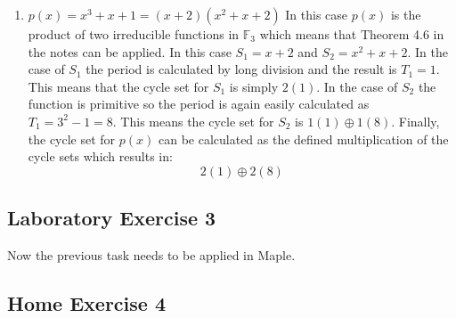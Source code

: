 \documentclass{article}
\begin{document}
\begin{enumerate}
    \item $p(x)=x^3+x+1=(x+2)(x^2+x+2)$ \newline
    In this case $p(x)$ is the product of two irreducible functions in $\mathbb F_{3}$ which means that Theorem 4.6 in the notes can be applied. In this case $S_1 = x+2$ and $S_2 = x^2+x+2$. In the case of $S_1$ the period is calculated by long division and the result is $T_1 = 1$. This means that the cycle set for $S_1$ is simply $2(1)$. In the case of $S_2$ the function is primitive so the period is again easily calculated as $T_1 = 3^2-1 = 8$. This means the cycle set for $S_2$ is $1(1) \oplus 1(8)$. 
    Finally, the cycle set for $p(x)$ can be calculated as the defined multiplication of the cycle sets which results in:
    $$2(1) \oplus 2(8)$$
\end{enumerate}

\subsection{Laboratory Exercise 3}
Now the previous task needs to be applied in Maple. 


\subsection{Home Exercise 4}
\end{document}

